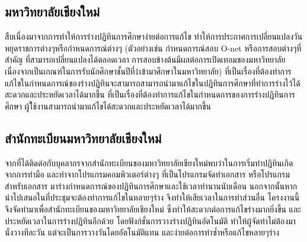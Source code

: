 \subsection{มหาวิทยาลัยเชียงใหม่}
สืบเนื่องมาจากการทำให้การร่างปฏิทินการศึกษาง่ายต่อการแก้ไข ทำให้การประกาศการเปลี่ยนแปลงวันหยุดราชการต่างๆหรือกำหนดการณ์ต่างๆ 
%
(ตัวอย่างเช่น กำหนดการณ์สอบ O-net หรือการสอบต่างๆที่สำคัญ ที่สามารถเปลี่ยนแปลงได้ตลอดเวลา การสอบข้างต้นมีผลต่อการเปิดเทอมของมหาวิทยาลัยเนื่องจากเป็นเกณฑ์ในการรับนักศึกษาชั้นปีที่1เข้ามาศึกษาในมหาวิทยาลัย) 
%
ที่เป็นเรื่องที่ต้องทำการแก้ไขในกำหนดการณ์ของร่างปฏิทินจะสามารถสามารถนำมาแก้ไขในปฏิทินการศึกษาที่ทำการร่างไว้ได้สะดวกและประหยัดเวลาได้มากขึ้น
%
ที่เป็นเรื่องที่ต้องทำการแก้ไขในกำหนดการของการร่างปฏิทินการศึกษา ผู้ใ้ช้งานสามารถนำมาแก้ไขได้สะดวกและประหยัดเวลาได้มากขึ้น 

\subsection{สำนักทะเบียนมหาวิทยาลัยเชียงใหม่ }
    จากที่ได้ติดต่อกับบุคลากรจากสำนักทะเบียนของมหาวิทยาลัยเชียงใหม่พบว่าในการเริ่มทำปฏิทินเกิดจากการทำมือ และทำจากโปรแกรมคอมพิวเตอร์ต่างๆ ที่เป็นโปรแกรมจัดทำเอกสาร
%
หรือโปรแกรมสำหรับเอกสาร มาร่างกำหนดการณ์ของปฏิทินการศึกษาและใช้เวลาทำนานนับเดือน นอกจากนั้นหากนำไปเสนอในที่ประชุมจะต้องทำการแก้ไขในหลายๆร่าง จึงทำให้เสียเวลาในการทำส่วนอื่น
%
โครงงานนี้จึงจัดทำมาเพื่อสำนักทะเบียนของมหาวิทยาลัยเชียงใหม่ ซึ่งทำให้สะดวกต่อการแก้ไขร่างมากยิ่งขึ้น และประหยัดเวลาในการร่างปฏิทินอีกด้วย โดยฟังก์ชั่นการวางร่างปฏิทินอัตโนมัติ ทำให้ผู้จัดทำไม่ต้องมานั่งวางทีละวัน แต่จะเป็นการวางวันโดยอัตโนมัติแทน และง่ายต่อการทำซ้ำหรือแก้ไขหลายๆร่าง

